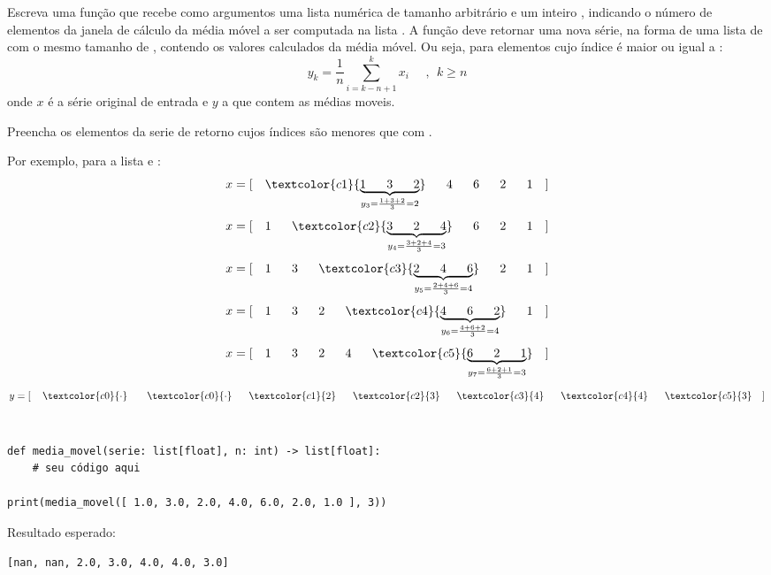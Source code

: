 
Escreva uma função  que recebe como argumentos uma
lista numérica  de tamanho arbitrário e um inteiro , indicando o
número de elementos da janela de cálculo da média móvel a ser computada na lista .
A função deve retornar uma nova série, na forma de uma lista de  com o  mesmo tamanho de ,
contendo os valores calculados da média móvel.
Ou seja, para elementos cujo índice é maior ou igual a :
\begin{equation}
    y_{k} =
        \dfrac{1}{n}\sum_{i=k-n+1}^k x_i \ \ \ \ \ \ , \ \   k \geq n
\end{equation}
onde $x$ é a série original de entrada e $y$ a que contem as médias moveis.

Preencha os elementos da serie de retorno cujos índices são menores que  com \inlcode{)}.

Por exemplo, para a lista \inlcode{[ 1.0, 3.0, 2.0, 4.0, 6.0, 2.0, 1.0 ]} e :
    $$
    x = [~~~ \textcolor{c1}{\underbrace{1~~~~~ 3~~~~~ 2}_{y_3 = \frac{1+3+2}{3}=2}}~~~~~ 4~~~~~ 6~~~~~ 2~~~~~ 1~~~ ]
    $$
    \vspace{-3mm}$$
    x = [~~~ 1~~~~~ \textcolor{c2}{\underbrace{3~~~~~ 2~~~~~ 4}_{y_4 = \frac{3+2+4}{3}=3}}~~~~~ 6~~~~~ 2~~~~~ 1~~~ ]
    $$
    \vspace{-3mm}$$
    x = [~~~ 1~~~~~ 3~~~~~ \textcolor{c3}{\underbrace{ 2~~~~~ 4~~~~~ 6}_{y_5 = \frac{2+4+6}{3}=4}}~~~~~ 2~~~~~ 1~~~ ]
    $$
    \vspace{-3mm}$$
    x = [~~~ 1~~~~~ 3~~~~~ 2~~~~~ \textcolor{c4}{\underbrace{ 4~~~~~ 6~~~~~ 2}_{y_6 = \frac{4+6+2}{3}=4}}~~~~~ 1~~~]
    $$
    \vspace{-3mm}$$
    x = [~~~ 1~~~~~ 3~~~~~ 2~~~~~ 4~~~~~ \textcolor{c5}{\underbrace{ 6~~~~~ 2~~~~~ 1}_{y_7 = \frac{6+2+1}{3}=3}} ~~~]
    $$
    \vspace{-3mm}$$
    y = [~~~ \, \textcolor{c0}{\cdot} \; ~~~~~ \textcolor{c0}{\cdot} ~~~~~ \textcolor{c1}{2}~~~~~ \textcolor{c2}{3}~~~~~ \textcolor{c3}{4}~~~~~ \textcolor{c4}{4}~~~~~ \textcolor{c5}{3}~~~ ]
    $$
    \\

\begin{verbatim}
def media_movel(serie: list[float], n: int) -> list[float]:
    # seu código aqui

print(media_movel([ 1.0, 3.0, 2.0, 4.0, 6.0, 2.0, 1.0 ], 3))
\end{verbatim}

Resultado esperado:
\begin{verbatim}
[nan, nan, 2.0, 3.0, 4.0, 4.0, 3.0]
\end{verbatim}




